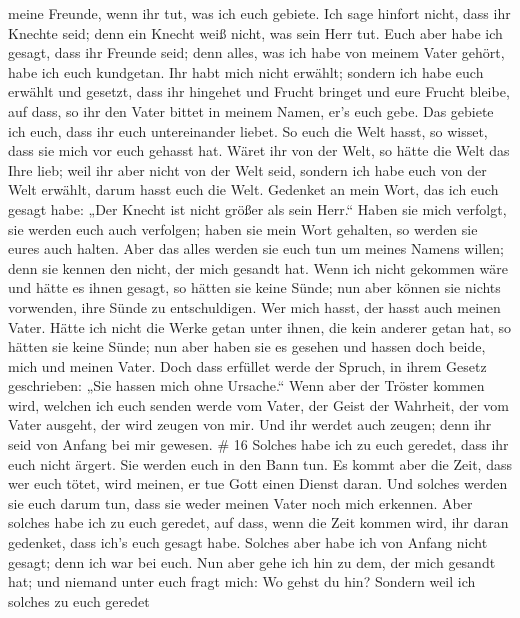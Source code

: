 meine Freunde, wenn ihr tut, was ich euch gebiete.  Ich
sage hinfort nicht, dass ihr Knechte seid; denn ein Knecht weiß nicht,
was sein Herr tut. Euch aber habe ich gesagt, dass ihr Freunde seid;
denn alles, was ich habe von meinem Vater gehört, habe ich euch
kundgetan.  Ihr habt mich nicht erwählt; sondern ich habe
euch erwählt und gesetzt, dass ihr hingehet und Frucht bringet und eure
Frucht bleibe, auf dass, so ihr den Vater bittet in meinem Namen, er's
euch gebe.  Das gebiete ich euch, dass ihr euch
untereinander liebet.  So euch die Welt hasst, so wisset,
dass sie mich vor euch gehasst hat.  Wäret ihr von der
Welt, so hätte die Welt das Ihre lieb; weil ihr aber nicht von der Welt
seid, sondern ich habe euch von der Welt erwählt, darum hasst euch die
Welt.  Gedenket an mein Wort, das ich euch gesagt habe:
„Der Knecht ist nicht größer als sein Herr.`` Haben sie mich verfolgt,
sie werden euch auch verfolgen; haben sie mein Wort gehalten, so werden
sie eures auch halten.  Aber das alles werden sie euch tun
um meines Namens willen; denn sie kennen den nicht, der mich gesandt
hat.  Wenn ich nicht gekommen wäre und hätte es ihnen
gesagt, so hätten sie keine Sünde; nun aber können sie nichts vorwenden,
ihre Sünde zu entschuldigen.  Wer mich hasst, der hasst
auch meinen Vater.  Hätte ich nicht die Werke getan unter
ihnen, die kein anderer getan hat, so hätten sie keine Sünde; nun aber
haben sie es gesehen und hassen doch beide, mich und meinen Vater.
 Doch dass erfüllet werde der Spruch, in ihrem Gesetz
geschrieben: „Sie hassen mich ohne Ursache.``  Wenn aber
der Tröster kommen wird, welchen ich euch senden werde vom Vater, der
Geist der Wahrheit, der vom Vater ausgeht, der wird zeugen von mir.
 Und ihr werdet auch zeugen; denn ihr seid von Anfang bei
mir gewesen. \# 16  Solches habe ich zu euch geredet, dass
ihr euch nicht ärgert.  Sie werden euch in den Bann tun. Es
kommt aber die Zeit, dass wer euch tötet, wird meinen, er tue Gott einen
Dienst daran.  Und solches werden sie euch darum tun, dass
sie weder meinen Vater noch mich erkennen.  Aber solches
habe ich zu euch geredet, auf dass, wenn die Zeit kommen wird, ihr daran
gedenket, dass ich's euch gesagt habe. Solches aber habe ich von Anfang
nicht gesagt; denn ich war bei euch.  Nun aber gehe ich hin
zu dem, der mich gesandt hat; und niemand unter euch fragt mich: Wo
gehst du hin?  Sondern weil ich solches zu euch geredet
